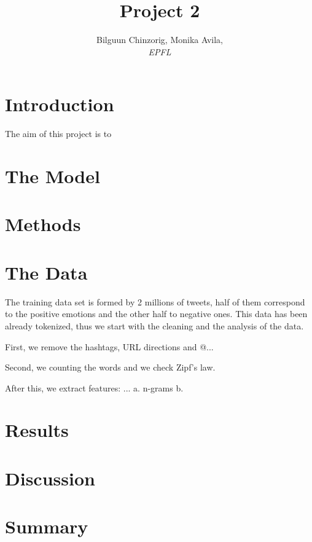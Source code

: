 \documentclass[10pt,conference,compsocconf]{IEEEtran}
\begin{document}
\title{Project 2}

\author{
Bilguun Chinzorig, Monika Avila, \\
  \textit{EPFL}
}

\maketitle

\begin{abstract}
  
\end{abstract}	\textbf{ }

\section{Introduction}

The aim of this project is to 
\section{The Model}
\label{S1}

\section{Methods}
\label{S2}

\section{The Data}
\label{S3}

The training data set is formed by 2 millions of tweets, half of them correspond to the positive emotions and the other half to negative ones. This data has been already tokenized, thus we start with the cleaning and the analysis of the data.  

First, we remove the hashtags, URL directions and @... 

Second, we  counting the words and we check Zipf's law.

After this, we extract features: ... 
a. n-grams 
b. 

\section{Results}
\label{S4}

\section{Discussion}
\label{S5}

\section{Summary}
\label{S6}
\end{document}
